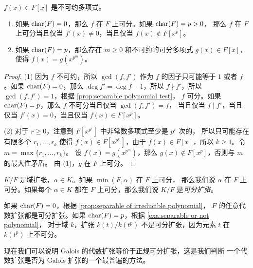 \begin{proposition}\label{prop:separable of irreducible polynomial}
  $f(x)\in F[x]$ 是不可约多项式。
  \begin{enumerate}
    \item 如果 $\operatorname{char}(F)=0$，那么 $f$ 在 $F$ 上可分。如果 $\operatorname{char}(F)=p>0$，
    那么 $f$ 在 $F$ 上可分当且仅当 $f'(x)\neq 0$，当且仅当
    $f(x)\notin F[x^p]$。
    \item 如果 $\operatorname{char}(F)=p$，那么存在 $m\geq 0$ 和不可约的可分多项式 $g(x)\in F[x]$，
    使得 $f(x)=g(x^{p^m})$。
  \end{enumerate}
\end{proposition}
\begin{proof}
  (1) 因为 $f$ 不可约，所以 $\gcd(f,f')$ 作为 $f$ 的因子只可能等于 $1$ 或者
  $f$ 。如果 $\operatorname{char}(F)=0$，那么 $\deg f'=\deg f-1$，所以 $f\nmid f'$，所以
  $\gcd(f,f')=1$，根据 \autoref{prop:separable polynomial test}，
  $f$ 可分。如果 $\operatorname{char}(F)=p$，那么 $f$ 不可分当且仅当 $\gcd(f,f')= f$，
  当且仅当 $f\mid f'$，当且仅当 $f'(x)=0$，当且仅当 $f(x)\in F[x^p]$。

  (2) 对于 $r\geq 0$，注意到 $F[x^{p^r}]$ 中非常数多项式至少是 $p^r$ 次的，
  所以只可能存在有限多个 $r_1,\dots,r_k$ 使得 $f(x)\in F[x^{p^{r_i}}]$，由于
  $f(x)\in F[x]$，所以 $k\geq 1$。令 $m=\max\{r_1,\dots,r_k\}$。
  设 $f(x)=g(x^{p^m})$，那么 $g(x)\notin F[x^p]$，否则与 $m$ 的最大性矛盾。
  由 (1)，$g$ 在 $F$ 上可分。
\end{proof}

\begin{definition}
  $K/F$ 是域扩张，$\alpha\in K$。如果 $\min(F,\alpha)$ 在 $F$ 上可分，
  那么我们说 $\alpha$ 在 $F$ 上可分。如果每个 $\alpha\in K$ 都在 $F$
  上可分，那么我们说 $K/F$ 是\emph{可分扩张}。
\end{definition}

\begin{example}
  如果 $\operatorname{char}(F)=0$，根据 \autoref{prop:separable of irreducible polynomial}，
  $F$ 的任意代数扩张都是可分扩张。如果 $\operatorname{char}(F)=p$，根据 \autoref{exa:separable or not polynomial}，
  对于域 $k$，扩张 $k(t)/k(t^p)$ 不是可分扩张，因为元素 $t$ 在 $k(t^p)$
  上不可分。
\end{example}

现在我们可以说明 Galois 的代数扩张等价于正规可分扩张，这是我们判断
一个代数扩张是否为 Galois 扩张的一个最普遍的方法。


